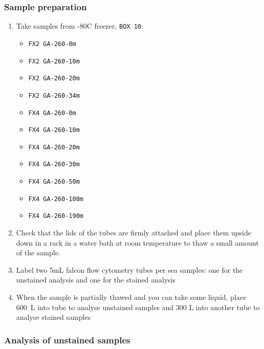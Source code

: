 \subsubsection{Sample preparation}
\begin{enumerate}
\item Take samples from -80\degree C freezer, \texttt{BOX 10}:
	\begin{itemize}
	\item[] \texttt{FX2 GA-260-0m}
	\item[] \texttt{FX2 GA-260-10m}
	\item[] \texttt{FX2 GA-260-20m}
	\item[] \texttt{FX2 GA-260-34m}
\\
	\item[] \texttt{FX4 GA-260-0m}
	\item[] \texttt{FX4 GA-260-10m}
	\item[] \texttt{FX4 GA-260-20m}
	\item[] \texttt{FX4 GA-260-30m}
	\item[] \texttt{FX4 GA-260-50m}
	\item[] \texttt{FX4 GA-260-100m}
	\item[] \texttt{FX4 GA-260-190m}
	\end{itemize}
\item Check that the lids of the tubes are firmly attached and place them upside down in a rack in a water bath at room temperature to thaw a small amount of the sample. 
\item Label two 5mL falcon flow cytometry tubes per sea samples: one for the unstained analysis and one for the stained analysis
\item When the sample is partially thawed and you can take some liquid, place 600~\textmu L into tube to analyse unstained samples and 300 \textmu L into another tube to analyse stained samples

\end{enumerate}

\subsubsection{Analysis of unstained samples}

